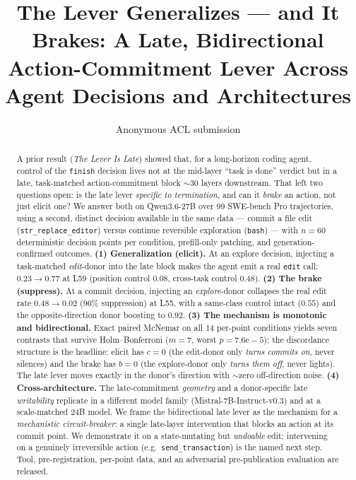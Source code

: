 \documentclass[11pt]{article}
\title{The Lever Generalizes --- and It Brakes: A Late, Bidirectional Action-Commitment Lever Across Agent Decisions and Architectures}
\author{Anonymous ACL submission}
\begin{document}
\maketitle

\begin{abstract}
A prior result (\emph{The Lever Is Late}) showed that, for a long-horizon coding agent, control of the
\texttt{finish} decision lives not at the mid-layer ``task is done'' verdict but in a late, task-matched
action-commitment block $\sim$30 layers downstream. That left two questions open: is the late lever
\emph{specific to termination}, and can it \emph{brake} an action, not just elicit one? We answer both on
Qwen3.6-27B over 99 SWE-bench Pro trajectories, using a second, distinct decision available in the same data
--- commit a file edit (\texttt{str\_replace\_editor}) versus continue reversible exploration (\texttt{bash})
--- with $n{=}60$ deterministic decision points per condition, prefill-only patching, and generation-confirmed
outcomes. \textbf{(1) Generalization (elicit).} At an explore decision, injecting a task-matched
\emph{edit}-donor into the late block makes the agent emit a real \texttt{edit} call: $0.23 \to 0.77$ at L59
(position control $0.08$, cross-task control $0.48$). \textbf{(2) The brake (suppress).} At a commit decision,
injecting an \emph{explore}-donor collapses the real edit rate $0.48 \to 0.02$ (96\% suppression) at L55, with
a same-class control intact ($0.55$) and the opposite-direction donor boosting to $0.92$. \textbf{(3) The
mechanism is monotonic and bidirectional.} Exact paired McNemar on all $14$ per-point conditions yields seven
contrasts that survive Holm--Bonferroni ($m{=}7$, worst $p{=}7.6\mathrm{e}{-}5$); the discordance structure is
the headline: elicit has $c{=}0$ (the edit-donor only \emph{turns commits on}, never silences) and the brake
has $b{=}0$ (the explore-donor only \emph{turns them off}, never lights). The late lever moves exactly in the
donor's direction with $\sim$zero off-direction noise. \textbf{(4) Cross-architecture.} The late-commitment
\emph{geometry} and a donor-specific late \emph{writability} replicate in a different model family
(Mistral-7B-Instruct-v0.3) and at a scale-matched 24B model. We frame the bidirectional late lever as the
mechanism for a \emph{mechanistic circuit-breaker}: a single late-layer intervention that blocks an action at
its commit point. We demonstrate it on a state-mutating but \emph{undoable} edit; intervening on a genuinely
irreversible action (e.g.\ \texttt{send\_transaction}) is the named next step. Tool, pre-registration,
per-point data, and an adversarial pre-publication evaluation are released.
\end{abstract}
\end{document}
